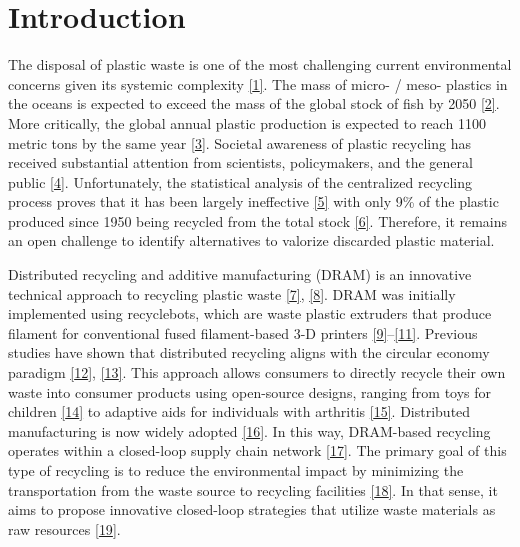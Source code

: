 \documentclass[
]{article}
\begin{document}

\hypertarget{introduction}{%
\section{Introduction}\label{introduction}}

\linenumbers

The disposal of plastic waste is one of the most challenging current
environmental concerns given its systemic complexity
\protect\hyperlink{ref-evode2021}{{[}1{]}}. The mass of micro- / meso-
plastics in the oceans is expected to exceed the mass of the global
stock of fish by 2050 \protect\hyperlink{ref-macarthur2017}{{[}2{]}}.
More critically, the global annual plastic production is expected to
reach 1100 metric tons by the same year
\protect\hyperlink{ref-geyer2020}{{[}3{]}}. Societal awareness of
plastic recycling has received substantial attention from scientists,
policymakers, and the general public
\protect\hyperlink{ref-soares2021}{{[}4{]}}. Unfortunately, the
statistical analysis of the centralized recycling process proves that it
has been largely ineffective
\protect\hyperlink{ref-Siltaloppi2021}{{[}5{]}} with only 9\% of the
plastic produced since 1950 being recycled from the total stock
\protect\hyperlink{ref-Geyer2017}{{[}6{]}}. Therefore, it remains an
open challenge to identify alternatives to valorize discarded plastic
material.

Distributed recycling and additive manufacturing (DRAM) is an innovative
technical approach to recycling plastic waste
\protect\hyperlink{ref-cruzsanchez2020}{{[}7{]}},
\protect\hyperlink{ref-dertinger2020}{{[}8{]}}. DRAM was initially
implemented using recyclebots, which are waste plastic extruders that
produce filament for conventional fused filament-based 3-D printers
\protect\hyperlink{ref-baechler2013}{{[}9{]}}--\protect\hyperlink{ref-woern2018}{{[}11{]}}.
Previous studies have shown that distributed recycling aligns with the
circular economy paradigm \protect\hyperlink{ref-Ford2016}{{[}12{]}},
\protect\hyperlink{ref-Despeisse2016}{{[}13{]}}. This approach allows
consumers to directly recycle their own waste into consumer products
using open-source designs, ranging from toys for children
\protect\hyperlink{ref-Petersen2017}{{[}14{]}} to adaptive aids for
individuals with arthritis \protect\hyperlink{ref-gallup2018}{{[}15{]}}.
Distributed manufacturing is now widely adopted
\protect\hyperlink{ref-pearce2022}{{[}16{]}}. In this way, DRAM-based
recycling operates within a closed-loop supply chain network
\protect\hyperlink{ref-santander2020}{{[}17{]}}. The primary goal of
this type of recycling is to reduce the environmental impact by
minimizing the transportation from the waste source to recycling
facilities \protect\hyperlink{ref-kreiger2014}{{[}18{]}}. In that sense,
it aims to propose innovative closed-loop strategies that utilize waste
materials as raw resources \protect\hyperlink{ref-romani2021}{{[}19{]}}.
\end{document}
